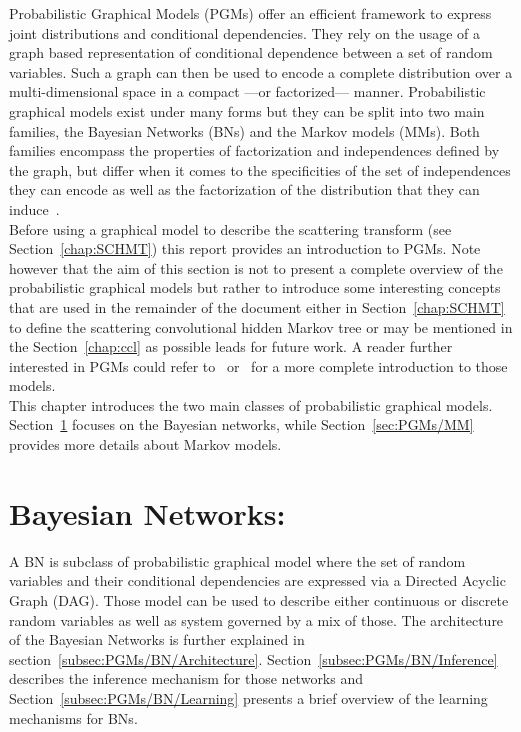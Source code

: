 \documentclass[a4paper,11pt]{report}
\begin{document}
  Probabilistic Graphical Models (PGMs) offer an efficient framework to express joint distributions and conditional dependencies. They rely on the usage of a graph based representation of conditional dependence between a set of random variables. Such a graph can then be used to encode a complete distribution over a multi-dimensional space in a compact ---or factorized--- manner. Probabilistic graphical models exist under many forms but they can be split into two main families, the Bayesian Networks (BNs) and the Markov models (MMs). Both families encompass the properties of factorization and independences defined by the graph, but differ when it comes to the specificities of the set of independences they can encode as well as the factorization of the distribution that they can induce~\citep{bishop2006pattern}.\\
  
  Before using a graphical model to describe the scattering transform (see Section~\ref{chap:SCHMT}) this report provides an introduction to PGMs. Note however that the aim of this section is not to present a complete overview of the probabilistic graphical models but rather to introduce some interesting concepts that are used in the remainder of the document either in Section~\ref{chap:SCHMT} to define the scattering convolutional hidden Markov tree or may be mentioned in the Section~\ref{chap:ccl} as possible leads for future work. A reader further interested in PGMs could refer to~\citep{heckerman1998tutorial} or~\citep{bishop2006pattern} for a more complete introduction to those models.\\
  
  This chapter introduces the two main classes of probabilistic graphical models. Section~\ref{sec:PGMs/BN} focuses on the Bayesian networks, while Section~\ref{sec:PGMs/MM} provides more details about Markov models.
	
  \section{Bayesian Networks:}  
    \label{sec:PGMs/BN}
    
    A BN is subclass of probabilistic graphical model where the set of random variables and their conditional dependencies are expressed via a Directed Acyclic Graph (DAG). Those model can be used to describe either continuous or discrete random variables as well as system governed by a mix of those. The architecture of the Bayesian Networks is further explained in section~\ref{subsec:PGMs/BN/Architecture}. Section~\ref{subsec:PGMs/BN/Inference} describes the inference mechanism for those networks and Section~\ref{subsec:PGMs/BN/Learning} presents a brief overview of the learning mechanisms for BNs.
        
\end{document}
